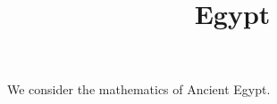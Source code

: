 \documentclass{ximera}
\title{Egypt}
\begin{document}
\begin{abstract}
\end{abstract}
\maketitle

We consider the mathematics of Ancient Egypt.
\end{document}
